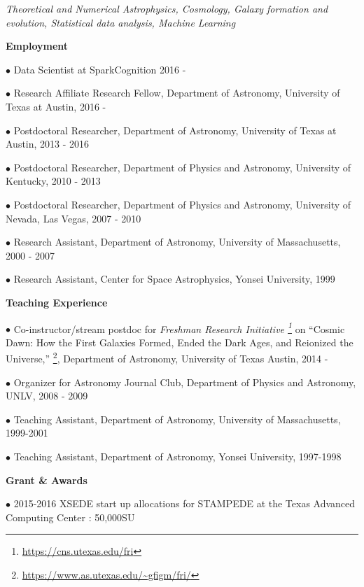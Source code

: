 \documentclass [11pt]{article}
\begin{document}
{\vspace{.05in}
\noindent \emph{Theoretical and Numerical Astrophysics, Cosmology, Galaxy formation and evolution, Statistical data analysis, Machine Learning}


\vspace{.2in}
\noindent \textbf{Employment}

\vspace{.02in}
\noindent
$\bullet$ Data Scientist at SparkCognition 2016 - 

\noindent
$\bullet$ Research Affiliate Research Fellow, Department of Astronomy, University of Texas at Austin, 2016 -

\noindent
$\bullet$ Postdoctoral Researcher, Department of Astronomy, University of Texas at Austin, 2013 - 2016

\noindent
$\bullet$ Postdoctoral Researcher, Department of Physics and Astronomy, University of Kentucky, 2010 - 2013

\noindent
$\bullet$ Postdoctoral Researcher, Department of Physics and Astronomy, University of Nevada, Las Vegas, 2007 - 2010

\noindent
$\bullet$ Research Assistant, Department of Astronomy, University of Massachusetts, 2000 - 2007

\noindent
$\bullet$ Research Assistant, Center for Space Astrophysics, Yonsei University, 1999


\vspace{.2in}
\noindent \textbf{Teaching Experience}

\vspace{.02in}
\noindent
$\bullet$ Co-instructor/stream postdoc for {\it Freshman Research Initiative \footnote{ \url{https://cns.utexas.edu/fri}}} on ``Cosmic Dawn: How the First Galaxies Formed, Ended the Dark Ages, and Reionized the Universe,'' \footnote{\url{https://www.as.utexas.edu/~gfigm/fri/}}, Department of Astronomy, University of Texas Austin, 2014 - 

\noindent
$\bullet$ Organizer for Astronomy Journal Club, Department of Physics and Astronomy, UNLV, 2008 - 2009

\noindent
$\bullet$ Teaching Assistant, Department of Astronomy, University of Massachusetts, 1999-2001

\noindent
$\bullet$ Teaching Assistant, Department of Astronomy, Yonsei University, 1997-1998

\vspace{.2in}
\noindent \textbf{Grant \& Awards}

\vspace{.02in}
\noindent
$\bullet$ 2015-2016 XSEDE start up allocations for STAMPEDE at the Texas Advanced Computing Center : 50,000SU

}
\end{document}
